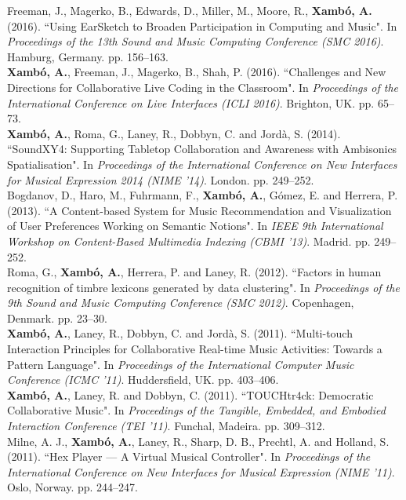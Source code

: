 \documentclass[10pt, a4paper]{article}
\newcommand{\years}[1]{\marginnote{\scriptsize #1}}
\begin{document}
{{\years{2016b}Freeman, J., Magerko, B., Edwards, D., Miller, M., Moore, R., \textbf{Xambó, A.} (2016). “Using EarSketch to Broaden Participation in Computing and Music". In \emph{Proceedings of the 13th Sound and Music Computing Conference (SMC 2016)}. Hamburg, Germany. pp. 156--163.\\
\years{2016a}\textbf{Xambó, A.}, Freeman, J., Magerko, B., Shah, P. (2016). “Challenges and New Directions for Collaborative Live Coding in the Classroom". In \emph{Proceedings of the International Conference on Live Interfaces (ICLI 2016)}. Brighton, UK. pp. 65--73.\\
\years{2014}\textbf{Xambó, A.}, Roma, G., Laney, R., Dobbyn, C. and Jordà, S. (2014). “SoundXY4: Supporting Tabletop Collaboration and Awareness with Ambisonics Spatialisation". In \emph{Proceedings of the International Conference on New Interfaces for Musical Expression 2014 (NIME '14)}. London. pp. 249--252.\\
\years{2013}Bogdanov, D., Haro, M., Fuhrmann, F., \textbf{Xambó, A.}, Gómez, E. and Herrera, P. (2013). “A Content-based System for Music Recommendation and Visualization of User Preferences Working on Semantic Notions". In \emph{IEEE 9th International Workshop on Content-Based Multimedia Indexing (CBMI '13)}. Madrid. pp. 249--252.\\
\years{2012}Roma, G., \textbf{Xambó, A.}, Herrera, P. and Laney, R. (2012). “Factors in human recognition of timbre lexicons generated by data clustering". In \emph{Proceedings of the 9th Sound and Music Computing Conference (SMC 2012)}. Copenhagen, Denmark. pp. 23--30.\\
\years{2011c}\textbf{Xambó, A.}, Laney, R., Dobbyn, C. and Jordà, S. (2011). “Multi-touch Interaction Principles for Collaborative Real-time Music Activities: Towards a Pattern Language". In \emph{Proceedings of the International Computer Music Conference (ICMC '11)}. Huddersfield, UK. pp. 403--406.\\
\years{2011b}\textbf{Xambó, A.}, Laney, R. and Dobbyn, C. (2011). “TOUCHtr4ck: Democratic Collaborative Music". In \emph{Proceedings of the Tangible, Embedded, and Embodied Interaction Conference (TEI '11)}. Funchal, Madeira. pp. 309--312.\\
\years{2011a}Milne, A. J., \textbf{Xambó, A.}, Laney, R., Sharp, D. B., Prechtl, A. and Holland, S. (2011). “Hex Player — A Virtual Musical Controller". In \emph{Proceedings of the International Conference on New Interfaces for Musical Expression (NIME '11)}. Oslo, Norway. pp. 244--247.\\
}}
\end{document}
